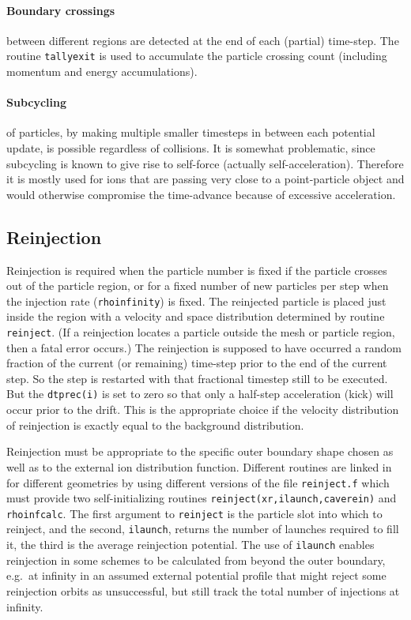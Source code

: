 \documentclass[12pt]{article}
\begin{document}
\paragraph{Boundary crossings} between different regions are detected
at the end of each (partial) time-step. The routine \verb!tallyexit!
is used to accumulate the particle crossing count (including momentum
and energy accumulations). 

\paragraph{Subcycling} of particles, by making multiple smaller
timesteps in between each potential update, is possible regardless of
collisions. It is somewhat problematic, since subcycling is known
to give rise to self-force (actually self-acceleration). Therefore it
is mostly used for ions that are passing very close to a
point-particle object and would otherwise compromise the time-advance
because of excessive acceleration.

\subsection{Reinjection} 
Reinjection is required when the particle number is fixed if the
particle crosses out of the particle region, or for a fixed number of
new particles per step when the injection rate (\verb!rhoinfinity!) is
fixed. The reinjected particle is placed just inside the region with a
velocity and space distribution determined by routine
\verb!reinject!. (If a reinjection locates a particle outside the mesh
or particle region, then a fatal error occurs.) The reinjection is
supposed to have occurred a random fraction of the current (or
remaining) time-step prior to the end of the current step. So the step
is restarted with that fractional timestep still to be executed. But
the \verb!dtprec(i)! is set to zero so that only a half-step
acceleration (kick) will occur prior to the drift. This is the
appropriate choice if the velocity distribution of reinjection is
exactly equal to the background distribution.

Reinjection must be appropriate to the specific outer boundary shape
chosen as well as to the external ion distribution function. Different
routines are linked in for different geometries by using different
versions of the file \verb!reinject.f! which must provide two
self-initializing routines \verb!reinject(xr,ilaunch,caverein)! and
\verb!rhoinfcalc!. The first argument to \verb!reinject! is the
particle slot into which to reinject, and the second, \verb!ilaunch!,
returns the number of launches required to fill it, the third is the
average reinjection potential. The use of \verb!ilaunch! enables
reinjection in some schemes to be calculated from beyond the outer
boundary, e.g.\ at infinity in an assumed external potential profile
that might reject some reinjection orbits as unsuccessful, but still
track the total number of injections at infinity.
\end{document}
